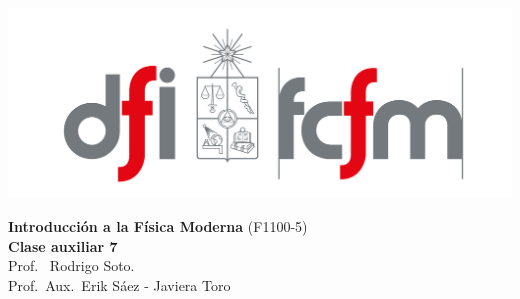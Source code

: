 \documentclass[
  11pt,
  letterpaper,
   addpoints,
   answers
  ]{exam}
\begin{document}
\pagestyle{headandfoot}

\noindent
\begin{minipage}{0.47\textwidth}
\includegraphics[width=\textwidth]{../fcfm_die.png}
\end{minipage}
\begin{minipage}{0.53\textwidth}
\begin{center} 
\large\textbf{Introducción a la Física Moderna} (F1100-5) \\
\large\textbf{Clase auxiliar 7} \\
\normalsize Prof.~ Rodrigo Soto.\\
\normalsize Prof.~Aux.~Erik Sáez - Javiera Toro 
\end{center}
\end{minipage}
\vspace{0.5cm}
\noindent
\vspace{.85cm}
\end{document}
